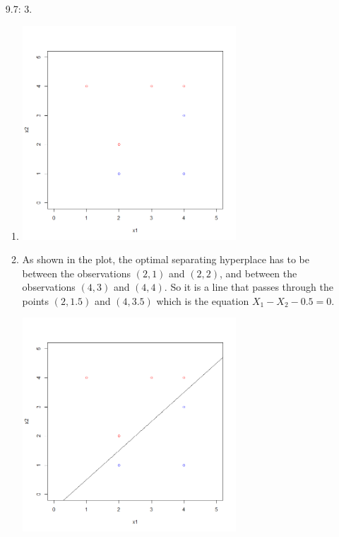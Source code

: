 \documentclass{article}
\begin{document}
\begin{enumerate}
    \item [9.7: 3. ]
    
    \begin{enumerate}
        \item 
        
        \begin{center}
            \includegraphics[width=8cm]{HW4_6a.png}
        \end{center}
        
        \item
        
        As shown in the plot, the optimal separating hyperplace has to be between the observations $(2, 1)$ and $(2, 2)$, and between the observations $(4, 3)$ and $(4, 4)$. So it is a line that passes through the points $(2, 1.5)$ and $(4, 3.5)$ which is the equation $X_1 - X_2 - 0.5 = 0.$
        \begin{center}
            \includegraphics[width=8cm]{HW4_6b.png}
        \end{center}
        

\end{enumerate}
\end{enumerate}
\end{document}
